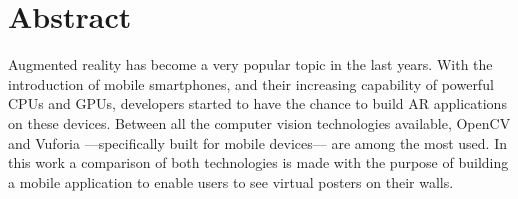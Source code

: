 \chapter{Abstract}
Augmented reality has become a very popular topic in the last years. With
the introduction of mobile smartphones, and their increasing capability of
powerful CPUs and GPUs, developers started to have the chance
to build AR applications on these devices. Between all the computer vision
technologies available, OpenCV and Vuforia ---specifically built for mobile
devices--- are among the most used. In this work a comparison of both technologies
is made with the purpose of building a mobile application to enable users to see
virtual posters on their walls.
